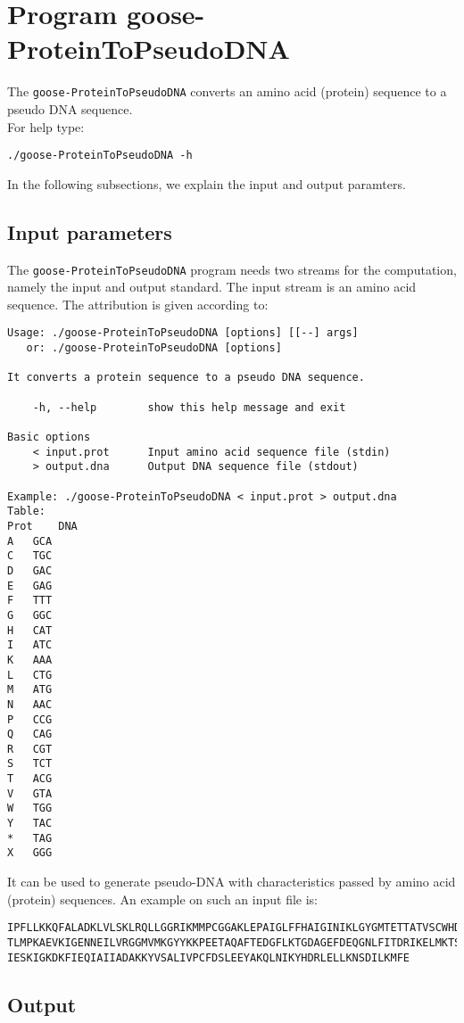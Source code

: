 \section{Program goose-ProteinToPseudoDNA}

The \texttt{goose-ProteinToPseudoDNA} converts an amino acid (protein) sequence to a pseudo DNA sequence.\\
For help type:
\begin{lstlisting}
./goose-ProteinToPseudoDNA -h
\end{lstlisting}
In the following subsections, we explain the input and output paramters.

\subsection{Input parameters}

The \texttt{goose-ProteinToPseudoDNA} program needs two streams for the computation,
namely the input and output standard. The input stream is an amino acid sequence.
The attribution is given according to:
\begin{lstlisting}
Usage: ./goose-ProteinToPseudoDNA [options] [[--] args]
   or: ./goose-ProteinToPseudoDNA [options]

It converts a protein sequence to a pseudo DNA sequence.

    -h, --help        show this help message and exit

Basic options
    < input.prot      Input amino acid sequence file (stdin)
    > output.dna      Output DNA sequence file (stdout)

Example: ./goose-ProteinToPseudoDNA < input.prot > output.dna
Table:
Prot	DNA
A	GCA
C	TGC
D	GAC
E	GAG
F	TTT
G	GGC
H	CAT
I	ATC
K	AAA
L	CTG
M	ATG
N	AAC
P	CCG
Q	CAG
R	CGT
S	TCT
T	ACG
V	GTA
W	TGG
Y	TAC
*	TAG
X	GGG
\end{lstlisting}
It can be used to generate pseudo-DNA with characteristics passed by amino acid (protein) sequences. An example on such an input file is:
\begin{lstlisting}
IPFLLKKQFALADKLVLSKLRQLLGGRIKMMPCGGAKLEPAIGLFFHAIGINIKLGYGMTETTATVSCWHDFQFNPNSIG
TLMPKAEVKIGENNEILVRGGMVMKGYYKKPEETAQAFTEDGFLKTGDAGEFDEQGNLFITDRIKELMKTSNGKYIAPQY
IESKIGKDKFIEQIAIIADAKKYVSALIVPCFDSLEEYAKQLNIKYHDRLELLKNSDILKMFE
\end{lstlisting}

\subsection{Output}

